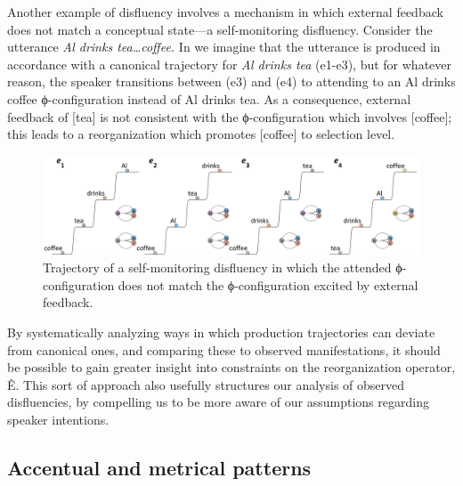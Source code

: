   Another example of disfluency involves a mechanism in which external feedback does not match a conceptual state—a self-monitoring disfluency. Consider the utterance \textit{Al drinks tea…coffee.} In {} we imagine that the utterance is produced in accordance with a canonical trajectory for \textit{Al drinks tea} (e1-e3), but for whatever reason, the speaker transitions between (e3) and (e4) to attending to an {\textbar}Al drinks coffee{\textbar} ϕ-configuration instead of {\textbar}Al drinks tea{\textbar}. As a consequence, external feedback of [tea] is not consistent with the ϕ-configuration which involves [coffee]; this leads to a reorganization which promotes [coffee] to selection level.

  
\begin{figure}
\includegraphics[width=\textwidth]{figures/Tilsen-img62.png}
\caption{Trajectory of a self-monitoring disfluency in which the attended ϕ-configuration does not match the ϕ-configuration excited by external feedback.}
\label{fig:4:12}
\end{figure}
 

  By systematically analyzing ways in which production trajectories can deviate from canonical ones, and comparing these to observed manifestations, it should be possible to gain greater insight into constraints on the reorganization operator, Ê. This sort of approach also usefully structures our analysis of observed disfluencies, by compelling us to be more aware of our assumptions regarding speaker intentions.

\subsection{Accentual and metrical patterns}

